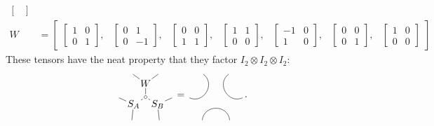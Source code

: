 \documentclass[oneside]{book}
\newcommand\sbullet[1][1.5pt]{%
  \tikz[baseline=-0.5ex]\draw (0,0) circle (#1);%
}
\begin{document}
\begin{align*}
\begin{bmatrix}
\end{bmatrix}
\\
W &= \begin{bmatrix}
\begin{bmatrix}1 & 0\\0 & 1\end{bmatrix}, &
\begin{bmatrix}0 & 1\\0 & -1\end{bmatrix}, &
\begin{bmatrix}0 & 0\\1 & 1\end{bmatrix}, &
\begin{bmatrix}1 & 1\\0 & 0\end{bmatrix}, &
\begin{bmatrix}-1 & 0\\1 & 0\end{bmatrix}, &
\begin{bmatrix}0 & 0\\0 & 1\end{bmatrix}, &
\begin{bmatrix}1 & 0\\0 & 0\end{bmatrix}
\end{bmatrix}
\end{align*}
These tensors have the neat property that they factor $I_2\otimes I_2\otimes I_2$:
\[
\begin{tikzpicture}[inner sep=1pt, baseline=.0em]
    \node (m) at (0,0) {$\sbullet$};
    \node (W) at (0,.5) {$W$};
    \node (SB) at (-30:.5) {$S_B$};
    \node (SA) at (-150:.5) {$S_A$};
    \node (w1) at (60:1) {};
    \node (w2) at (120:1) {};
    \node (sa1) at (-120:1) {};
    \node (sa2) at (-180:1) {};
    \node (sb1) at (-0:1) {};
    \node (sb2) at (-60:1) {};
    \draw (m) -- (W);
    \draw (m) -- (SA);
    \draw (m) -- (SB);
    \draw (W) -- (w1) {};
    \draw (W) -- (w2) {};
    \draw (SB) -- (sb1) {};
    \draw (SB) -- (sb2) {};
    \draw (SA) -- (sa1) {};
    \draw (SA) -- (sa2) {};
\end{tikzpicture}
=
\begin{tikzpicture}[inner sep=1pt, baseline=.0em]
    \node (m) at (0,0) {};
    \node (W) at (0,.5) {};
    \node (SB) at (-30:.5) {};
    \node (SA) at (-150:.5) {};
    \node (w1) at (60:1) {};
    \node (w2) at (120:1) {};
    \node (sa1) at (-120:1) {};
    \node (sa2) at (-180:1) {};
    \node (sb1) at (-0:1) {};
    \node (sb2) at (-60:1) {};
    \draw (sa2) .. controls (SA) and (W) .. (w2);
    \draw (sa1) .. controls (SA) and (SB) .. (sb2);
    \draw (sb1) .. controls (SB) and (W) .. (w1);
\end{tikzpicture}
.
\]
\end{document}
